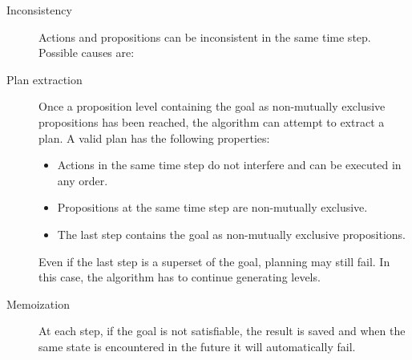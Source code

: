 \begin{description}
    \item[Inconsistency] 
        Actions and propositions can be inconsistent in the same time step.
        Possible causes are:

    \item[Plan extraction] 
        Once a proposition level containing the goal as non-mutually exclusive propositions has been reached,
        the algorithm can attempt to extract a plan.
        A valid plan has the following properties:
        \begin{itemize}
            \item Actions in the same time step do not interfere and can be executed in any order.
            \item Propositions at the same time step are non-mutually exclusive.
            \item The last step contains the goal as non-mutually exclusive propositions.
        \end{itemize}
        Even if the last step is a superset of the goal, planning may still fail.
        In this case, the algorithm has to continue generating levels.

    \item[Memoization] 
        At each step, if the goal is not satisfiable, the result is saved and 
        when the same state is encountered in the future it will automatically fail.
\end{description}


